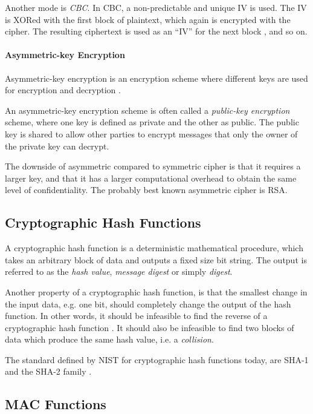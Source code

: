 \documentclass[pdftex,english,10pt,b5paper,twoside]{book}
\begin{document}
Another mode is \emph{\ac{CBC}}. In \ac{CBC}, a non-predictable and unique
\ac{IV} is used. The \ac{IV} is XORed with the first block of plaintext, which
again is encrypted with the cipher. The resulting ciphertext is used as an
``\ac{IV}'' for the next block \cite[p. 183]{stallings}, and so on.

\paragraph{Asymmetric-key Encryption} Asymmetric-key encryption is an encryption scheme
where different keys are used for encryption and decryption
\cite[p. 259]{stallings}.

An asymmetric-key encryption scheme is often called a \emph{public-key
encryption} scheme, where one key is defined as private and the other as public.
The public key is shared to allow other parties to encrypt messages that only the
owner of the private key can decrypt.

The downside of asymmetric compared to symmetric cipher is that it requires a
larger key, and that it has a larger computational overhead to obtain the same
level of confidentiality. The probably best known asymmetric cipher is
\ac{RSA}.

\subsection{Cryptographic Hash Functions}

A cryptographic hash function is a deterministic mathematical procedure, which
takes an arbitrary block of data and outputs a fixed size bit string. The
output is referred to as the \emph{hash value}, \emph{message digest} or simply
\emph{digest}.

Another property of a cryptographic hash function, is that the
smallest change in the input data, e.g. one bit, should completely change the
output of the hash function. In other words, it should be infeasible to find the
reverse of a cryptographic hash function \cite[p. 335]{stallings}. It should
also be infeasible to find two blocks of data which produce the same hash
value, i.e. a \emph{collision}.

The standard defined by \ac{NIST} for cryptographic hash functions today, are
\ac{SHA}-1 and the \ac{SHA}-2 family \cite{SHA-FIPS}. %


\subsection{MAC Functions} 
\end{document}
